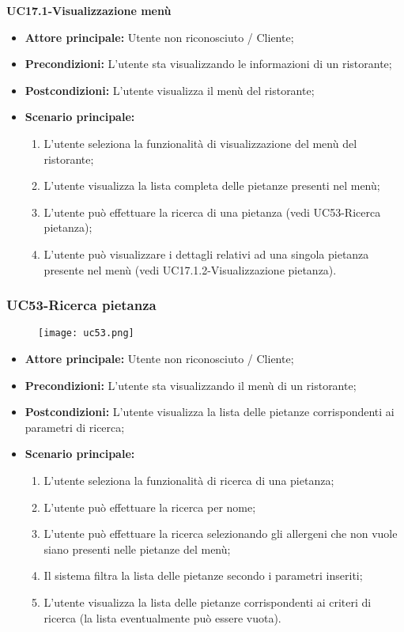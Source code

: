 \pagebreak
\textbf{UC17.1-Visualizzazione menù}
\begin{itemize}
\item \textbf{Attore principale:} Utente non riconosciuto / Cliente;
\item \textbf{Precondizioni:} L'utente sta visualizzando le informazioni di un ristorante;
\item \textbf{Postcondizioni:} L'utente visualizza il menù del ristorante;
\item \textbf{Scenario principale:}
\begin{enumerate}
    \item L'utente seleziona la funzionalità di visualizzazione del menù del ristorante;
    \item L'utente visualizza la lista completa delle pietanze presenti nel menù;
    \item L'utente può effettuare la ricerca di una pietanza (vedi UC53-Ricerca pietanza);
    \item L'utente può visualizzare i dettagli relativi ad una singola pietanza presente nel menù (vedi UC17.1.2-Visualizzazione pietanza).
\end{enumerate}
\end{itemize}

\subsubsection{UC53-Ricerca pietanza}
\begin{figure}[h] \texttt{[image: uc53.png]} \end{figure}
\begin{itemize}
\item \textbf{Attore principale:} Utente non riconosciuto / Cliente;
\item \textbf{Precondizioni:} L'utente sta visualizzando il menù di un ristorante;
\item \textbf{Postcondizioni:} L'utente visualizza la lista delle pietanze corrispondenti ai parametri di ricerca;
\item \textbf{Scenario principale:}
\begin{enumerate}
    \item L'utente seleziona la funzionalità di ricerca di una pietanza;
    \item L'utente può effettuare la ricerca per nome;
    \item L'utente può effettuare la ricerca selezionando gli allergeni che non vuole siano presenti nelle pietanze del menù;
    \item Il sistema filtra la lista delle pietanze secondo i parametri inseriti;
    \item L'utente visualizza la lista delle pietanze corrispondenti ai criteri di ricerca (la lista eventualmente può essere vuota).
\end{enumerate}
\end{itemize}

